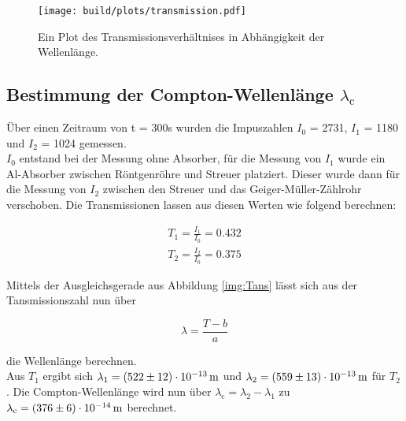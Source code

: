             \begin{figure}[h]
                \centering
                \texttt{[image: build/plots/transmission.pdf]}
                \caption{Ein Plot des Transmissionsverhältnises in Abhängigkeit der Wellenlänge.}
                \label{img:Trans}
            \end{figure}

    \subsection{Bestimmung der Compton-Wellenlänge \texorpdfstring{$\lambda_{\text{c}}$}{TEXT}}

        \noindent Über einen Zeitraum von t = 300s wurden die Impuszahlen $I_0$ = 2731, $I_1$ = 1180 und $I_2$ = 1024 gemessen.\\
        $I_0$ entstand bei der Messung ohne Absorber, für die Messung von $I_1$ wurde ein Al-Absorber zwischen Röntgenröhre und 
        Streuer platziert. Dieser wurde dann für die Messung von $I_2$ zwischen den Streuer und das Geiger-Müller-Zählrohr verschoben.
        Die Transmissionen lassen aus diesen Werten wie folgend berechnen:

            \begin{align}
                T_1 = \frac{I_1}{I_0} = 0.432   \nonumber\\
                T_2 = \frac{I_2}{I_0} = 0.375   \nonumber
            \end{align}

        \noindent Mittels der Ausgleichsgerade aus Abbildung \ref{img:Tans} lässt sich aus der Tansmissionszahl nun über 
            
            \begin{equation*}
                \lambda = \frac{T - b}{a}
            \end{equation*}

        \noindent die Wellenlänge berechnen.\\
        Aus $T_1$ ergibt sich $\lambda_1 = \SI{522 (12)e-13}{\meter}$ und $\lambda_2 = 
        \SI{559  (13)e-13}{\meter}$ für $T_2$. Die Compton-Wellenlänge wird nun über $\lambda_{\text{c}} = \lambda_2 - \lambda_1$ zu 
        $\lambda_{\text{c}} = \SI{376 (6) e-14}{\meter}$ berechnet.

            

    


    